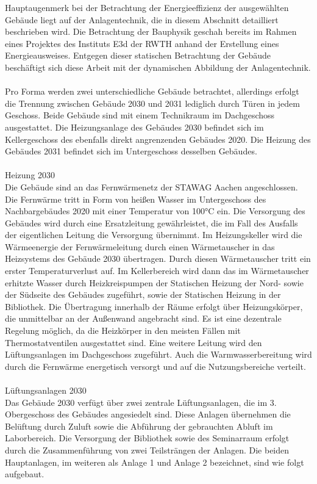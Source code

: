 Hauptaugenmerk bei der Betrachtung der Energieeffizienz der ausgewählten Gebäude liegt auf der Anlagentechnik, die in diesem Abschnitt detailliert beschrieben wird. Die Betrachtung der Bauphysik geschah bereits im Rahmen eines Projektes des Instituts E3d der RWTH anhand der Erstellung eines Energieausweises. Entgegen dieser statischen Betrachtung der Gebäude beschäftigt sich diese Arbeit mit der dynamischen Abbildung der Anlagentechnik.\\
\\
Pro Forma werden zwei unterschiedliche Gebäude betrachtet, allerdings erfolgt die Trennung zwischen Gebäude 2030 und 2031  lediglich durch Türen in jedem Geschoss. Beide Gebäude sind mit einem Technikraum im Dachgeschoss ausgestattet. Die Heizungsanlage des Gebäudes 2030 befindet sich im Kellergeschoss des ebenfalls direkt angrenzenden Gebäudes 2020. Die Heizung des Gebäudes 2031 befindet sich im Untergeschoss desselben Gebäudes.\\
\\
Heizung 2030\\
Die Gebäude sind an das Fernwärmenetz der STAWAG Aachen angeschlossen. Die Fernwärme tritt in Form von heißen Wasser im Untergeschoss des Nachbargebäudes 2020 mit einer Temperatur von 100°C ein. Die Versorgung des Gebäudes wird durch eine Ersatzleitung gewährleistet, die im Fall des Ausfalls der eigentlichen Leitung die Versorgung übernimmt. Im Heizungskeller wird die Wärmeenergie der Fernwärmeleitung durch einen Wärmetauscher in das Heizsystems des Gebäude 2030 übertragen. Durch diesen Wärmetauscher tritt ein erster Temperaturverlust auf. Im Kellerbereich wird dann das im Wärmetauscher erhitzte Wasser durch Heizkreispumpen der Statischen Heizung der Nord- sowie der Südseite des Gebäudes zugeführt, sowie der Statischen Heizung in der Bibliothek. Die Übertragung innerhalb der Räume erfolgt über Heizungskörper, die unmittelbar an der Außenwand angebracht sind. Es ist eine dezentrale Regelung möglich, da die Heizkörper in den meisten Fällen mit Thermostatventilen ausgestattet sind. Eine weitere Leitung wird den Lüftungsanlagen im Dachgeschoss zugeführt. Auch die Warmwasserbereitung wird durch die Fernwärme energetisch versorgt und auf die Nutzungsbereiche verteilt. \\
\\
Lüftungsanlagen 2030\\
Das Gebäude 2030 verfügt über zwei zentrale Lüftungsanlagen, die im 3. Obergeschoss des Gebäudes angesiedelt sind. Diese Anlagen übernehmen die Belüftung durch Zuluft sowie die Abführung der gebrauchten Abluft im Laborbereich. Die Versorgung der Bibliothek sowie des Seminarraum erfolgt durch die Zusammenführung von zwei Teilsträngen der Anlagen. Die beiden Hauptanlagen, im weiteren als Anlage 1 und Anlage 2 bezeichnet, sind wie folgt aufgebaut.\\

